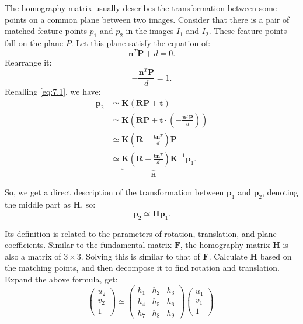 The homography matrix usually describes the transformation between some points on a common plane between two images. Consider that there is a pair of matched feature points $p_{1}$ and $p_{2}$ in the images $I_{1}$ and $I_{2}$. These feature points fall on the plane $P$. Let this plane satisfy the equation of:
\begin{equation}
\mathbf{n}^T \mathbf{P} + d = 0.
\end{equation}
Rearrange it:
\begin{equation}
- \frac{\mathbf{n}^T \mathbf{P} }{d} = 1.
\end{equation}
Recalling \eqref{eq:7.1}, we have: 
\begin{align*}
\mathbf{p}_2 &\simeq \mathbf{K} ( \mathbf{R} \mathbf{P} + \mathbf{t} ) \\ 
&\simeq \mathbf{K} \left( \mathbf{R} \mathbf{P} + \mathbf{t} \cdot (- \frac{\mathbf{n}^T \mathbf{P} }{d}) \right) \\
&\simeq \mathbf{K} \left( \mathbf{R} - \frac{\mathbf{t} \mathbf{n}^T }{d} \right) \mathbf{P} \\ 
&\simeq \underbrace{\mathbf{K} \left( \mathbf{R} - \frac{\mathbf{t} \mathbf{n}^T }{d} \right) \mathbf{K}^{-1}}_{\mathbf{H}} \mathbf{p}_1.
\end{align*}

So, we get a direct description of the transformation between $\mathbf{p}_1$ and $\mathbf{p}_2$, denoting the middle part as $\mathbf{H}$, so:
\begin{equation}
\mathbf{p}_2 \simeq \mathbf{H} \mathbf{p}_1.
\end{equation}

Its definition is related to the parameters of rotation, translation, and plane coefficients. Similar to the fundamental matrix $\mathbf{F}$, the homography matrix $\mathbf{H}$ is also a matrix of $3 \times 3$. Solving this is similar to that of $\mathbf{F}$. Calculate $\mathbf{H}$ based on the matching points, and then decompose it to find rotation and translation. Expand the above formula, get:
\begin{equation}
\begin{pmatrix} 
u_{2}\\v_{2}\\1
\end{pmatrix}
\simeq
\begin{pmatrix}
 h_{1} & h_{2} & h_{3}\\ 
 h_{4} & h_{5} & h_{6}\\ 
 h_{7} & h_{8} & h_{9} 
\end{pmatrix}
\begin{pmatrix} 
u_{1}\\v_{1}\\1
\end{pmatrix}.
\end{equation}

